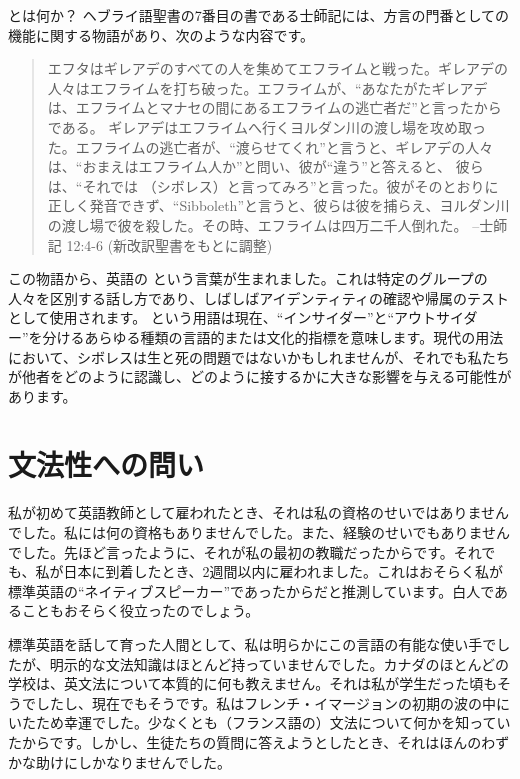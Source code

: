\begin{tblsframed}{とは何か？} \label{sec:shibboleth}
    ヘブライ語聖書の7番目の書である士師記には、方言の門番としての機能に関する物語があり、次のような内容です。

    \begin{quote}
        エフタはギレアデのすべての人を集めてエフライムと戦った。ギレアデの人々はエフライムを打ち破った。エフライムが、\enquote{あなたがたギレアデは、エフライムとマナセの間にあるエフライムの逃亡者だ}と言ったからである。
        ギレアデはエフライムへ行くヨルダン川の渡し場を攻め取った。エフライムの逃亡者が、\enquote{渡らせてくれ}と言うと、ギレアデの人々は、\enquote{おまえはエフライム人か}と問い、彼が\enquote{違う}と答えると、
        彼らは、\enquote{それでは （シボレス）と言ってみろ}と言った。彼がそのとおりに正しく発音できず、\enquote{Sibboleth}と言うと、彼らは彼を捕らえ、ヨルダン川の渡し場で彼を殺した。その時、エフライムは四万二千人倒れた。 --士師記 12:4-6 (新改訳聖書をもとに調整)
    \end{quote}

    \indent この物語から、英語の  という言葉が生まれました。これは特定のグループの人々を区別する話し方であり、しばしばアイデンティティの確認や帰属のテストとして使用されます。 という用語は現在、\enquote{インサイダー}と\enquote{アウトサイダー}を分けるあらゆる種類の言語的または文化的指標を意味します。現代の用法において、シボレスは生と死の問題ではないかもしれませんが、それでも私たちが他者をどのように認識し、どのように接するかに大きな影響を与える可能性があります。

\end{tblsframed}

\section{文法性への問い} \label{sec:questioning-grammaticality}

私が初めて英語教師として雇われたとき、それは私の資格のせいではありませんでした。私には何の資格もありませんでした。また、経験のせいでもありませんでした。先ほど言ったように、それが私の最初の教職だったからです。それでも、私が日本に到着したとき、2週間以内に雇われました。これはおそらく私が標準英語の\enquote{ネイティブスピーカー}であったからだと推測しています。白人であることもおそらく役立ったのでしょう。

標準英語を話して育った人間として、私は明らかにこの言語の有能な使い手でしたが、明示的な文法知識はほとんど持っていませんでした。カナダのほとんどの学校は、英文法について本質的に何も教えません。それは私が学生だった頃もそうでしたし、現在でもそうです。私はフレンチ・イマージョンの初期の波の中にいたため幸運でした。少なくとも（フランス語の）文法について何かを知っていたからです。しかし、生徒たちの質問に答えようとしたとき、それはほんのわずかな助けにしかなりませんでした。

